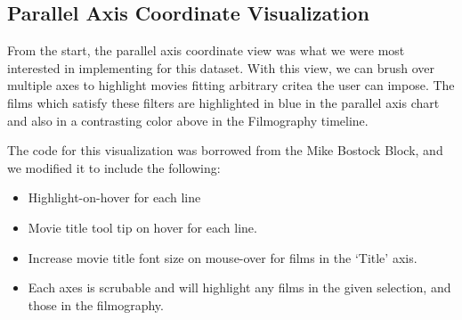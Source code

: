 \documentclass[12pt]{article}
\begin{document}
\newpage 

\subsection{Parallel Axis Coordinate Visualization}
	
From the start, the parallel axis coordinate view was what we were most interested in implementing for this dataset. With this view, we can brush over multiple axes to highlight movies fitting arbitrary critea the user can impose.  The films which satisfy these filters are highlighted in blue in the parallel axis chart and also in a contrasting color above in the Filmography timeline.

The code for this visualization was borrowed from the Mike Bostock Block, and we modified it to include the following:

\begin{itemize}
	\item Highlight-on-hover  for each line
	\item Movie title tool tip on hover for each line.
	\item Increase movie title font size on mouse-over for films  in the `Title' axis.
	\item Each axes is scrubable and will highlight any films in the given selection, and those in the filmography.
\end{itemize}
\end{document}
